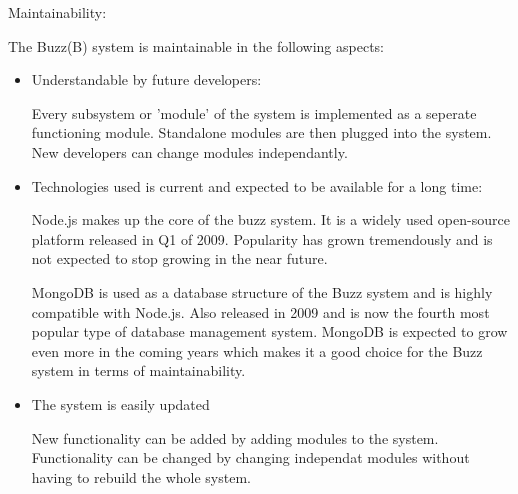 \item Maintainability:

The Buzz(B) system is maintainable in the following aspects:

\begin{itemize}
\item Understandable by future developers:

Every subsystem or 'module' of the system is implemented as a seperate functioning module.
Standalone modules are then plugged into the system.
New developers can change modules independantly.
\item Technologies used is current and expected to be available for a long time:

Node.js makes up the core of the buzz system. It is a widely used open-source platform released in Q1 of 2009. Popularity has grown tremendously and is not expected to stop growing in the near future. 

MongoDB is used as a database structure of the Buzz system and is highly compatible with Node.js. Also released in 2009 and is now the fourth most popular type of database management system.  MongoDB is expected to grow even more in the coming years which makes it   a good choice for the Buzz system in terms of maintainability.

\item The system is easily updated

New functionality can be added by adding modules to the system.
Functionality can be changed by changing independat modules without having to rebuild the whole system.
\end{itemize}